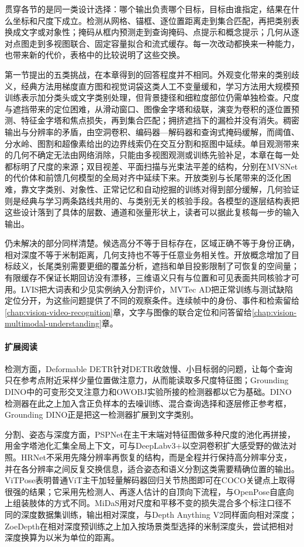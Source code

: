 贯穿各节的是同一类设计选择：哪个输出负责哪个目标，目标由谁指定，结果在什么坐标和尺度下成立。检测从网格、锚框、逐位置距离走到集合匹配，再把类别表换成文字或对象性；掩码从框内预测走到查询掩码、点提示和概念提示；几何从逐对点图走到多视图联合、固定容量拟合和流式缓存。每一次改动都换来一种能力，也带来新的代价，表格中的比较说明了这些交换。

第一节提出的五类挑战，在本章得到的回答程度并不相同。外观变化带来的类别歧义，经典方法用梯度直方图和视觉词袋这类人工不变量缓和，学习方法用大规模预训练表示加分类头或文字类别处理，但背景捷径和细粒度部位仍需单独检查。尺度与遮挡带来的定位困难，从滑动窗口、图像金字塔和级联，演变为卷积的逐位置预测、特征金字塔和焦点损失，再到集合匹配；拥挤遮挡下的漏检并没有消失。稠密输出与分辨率的矛盾，由空洞卷积、编码器—解码器和查询式掩码缓解，而阈值、分水岭、图割和超像素给出的边界线索仍在交互分割和抠图中延续。单目观测带来的几何不确定无法由网络消除，只能由多视图观测或训练先验补足，本章在每一处都标明了尺度的来源；双目视差、平面扫描与光束法平差的结构，分别在MVSNet的代价体和前馈几何模型的全局对齐中延续下来。开放类别与长尾带来的泛化困难，靠文字类别、对象性、正常记忆和自动挖掘的训练对得到部分缓解，几何验证则是经典与学习两条路线共用的、与类别无关的核验手段。各模型的逐层结构表把这些设计落到了具体的层数、通道和张量形状上，读者可以据此复核每一步的输入输出。

仍未解决的部分同样清楚。候选高分不等于目标存在，区域正确不等于身份正确，相对深度不等于米制距离，几何支持也不等于任意业务相关性。开放概念增加了目标歧义，长尾类别需要更细的覆盖分析，遮挡和单目投影限制了可恢复的空间量；有限缓存不保证长期回访没有漂移，三维语义只有与位置和可见表面共同核验才可用。LVIS把大词表和少见实例纳入分割评价，MVTec AD把正常训练与测试缺陷定位分开，为这些问题提供了不同的观察条件。连续帧中的身份、事件和检索留给\ref{chap:vision-video-recognition}章，文字与图像的联合定位和问答留给\ref{chap:vision-multimodal-understanding}章。

\paragraph{扩展阅读}
检测方面，Deformable DETR针对DETR收敛慢、小目标弱的问题，让每个查询只在参考点附近采样少量位置做注意力，从而能读取多尺度特征图；Grounding DINO中的可变形交叉注意力和OWOBJ实验所接的检测器都以它为基础。DINO检测器在此之上加入含正负样本的去噪训练、混合查询选择和逐层修正参考框，Grounding DINO正是把这一检测器扩展到文字类别。

分割、姿态与深度方面，PSPNet在主干末端对特征图做多种尺度的池化再拼接，用金字塔池化汇集全局上下文，可与DeepLabv3+以空洞卷积扩大感受野的做法对照。HRNet不采用先降分辨率再恢复的结构，而是全程并行保持高分辨率分支，并在各分辨率之间反复交换信息，适合姿态和语义分割这类需要精确位置的输出。ViTPose表明普通ViT主干加轻量解码器回归关节热图即可在COCO关键点上取得很强的结果；它采用先检测人、再逐人估计的自顶向下流程，与OpenPose自底向上组装肢体的方式不同。MiDaS用对尺度和平移不变的损失混合多个标注口径不同的深度数据集训练，输出相对深度，与Depth Anything V2同样面向相对深度；ZoeDepth在相对深度预训练之上加入按场景类型选择的米制深度头，尝试把相对深度换算为以米为单位的距离。

